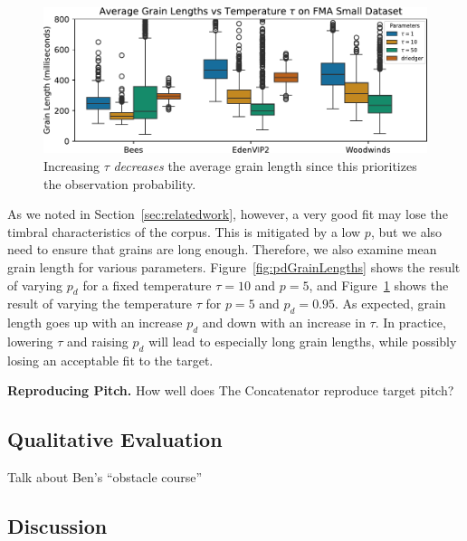 \documentclass{article}
\begin{document}
\begin{figure}
    \centering
    \includegraphics[width=\columnwidth]{figs/tempGrainLengths.pdf}
    \caption{Increasing $\tau$ {\em decreases} the average grain length since this prioritizes the observation probability.}
    \label{fig:tempGrainLengths}
\end{figure}

As we noted in Section~\ref{sec:relatedwork}, however, a very good fit may lose the timbral characteristics of the corpus.  This is mitigated by a low $p$, but we also need to ensure that grains are long enough.  Therefore, we also examine mean grain length for various parameters.  Figure~\ref{fig:pdGrainLengths} shows the result of varying $p_d$ for a fixed temperature $\tau=10$ and $p=5$, and Figure~\ref{fig:tempGrainLengths} shows the result of varying the temperature $\tau$ for $p=5$ and $p_d = 0.95$.  As expected, grain length goes up with an increase $p_d$ and down with an increase in $\tau$.  In practice, lowering $\tau$ and raising $p_d$ will lead to especially long grain lengths, while possibly losing an acceptable fit to the target.


\textbf{Reproducing Pitch.} How well does The Concatenator reproduce target pitch?




\subsection{Qualitative Evaluation}

Talk about Ben's ``obstacle course''

\subsection{Discussion}
\end{document}

